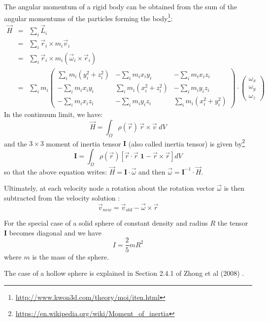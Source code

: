 The angular momentum of a rigid body can be obtained from the sum 
of the angular momentums of the particles forming the 
body\footnote{\url{http://www.kwon3d.com/theory/moi/iten.html}}:
\begin{eqnarray}
\vec H 
&=& \sum_i \vec L_i\\
&=& \sum_i \vec r_i \times m_i \vec v_i\\
&=& \sum_i \vec r_i \times m_i (\vec \omega_i \times \vec r_i)\\
&=& \sum_i m_i 
\left(
\begin{array}{ccc}
\sum_i m_i(y_i^2+z_i^2) & -\sum_i m_i x_iy_i & -\sum_i m_i x_i z_i \\
-\sum_i m_i x_iy_i & \sum_i m_i(x_i^2+z_i^2) & -\sum_i m_i y_i z_i \\
-\sum_i m_i x_i z_i & -\sum_i m_i y_i z_i & \sum_i m_i(x_i^2+y_i^2)
\end{array}
\right)
\cdot
\left(
\begin{array}{c}
\omega_x \\ \omega_y \\ \omega_z
\end{array}
\right)
\end{eqnarray}
In the continuum limit, we have:
\begin{equation}
{\vec H} = \int_\Omega \rho(\vec r) \, {\vec r} \times {\vec v}\; dV
\end{equation}
and the $3\times3$ moment of inertia tensor $\bm I$
(also called inertia tensor) is given by\footnote{\url{https://en.wikipedia.org/wiki/Moment\_of\_inertia}}
\begin{equation}
{\bm I}= 
\int_\Omega \rho(\vec r) [\vec r\cdot\vec r \; \bm 1 - \vec r \times \vec r  ] dV
\end{equation}
so that the above equation writes:
$
{\vec H}={\bm I}\cdot {\vec \omega}
$
and then ${\vec \omega}={\bm I}^{-1} \cdot {\vec H}$.

Ultimately, at each velocity node a rotation about the rotation 
vector ${\vec \omega}$ is then subtracted from the velocity 
solution \cite[eq. 26]{zhmt08}:
\begin{equation}
\vec v_{new} = \vec v_{old} - \vec \omega \times \vec r 
\end{equation}

For the special case of a solid sphere of constant density
and radius $R$ the tensor ${\bm I}$ becomes diagonal
and we have 
\[
I=\frac{2}{5}m R^2
\]
where $m$ is the mass of the sphere. 

The case of a hollow sphere is explained in Section 2.4.1 of Zhong et al (2008) \cite{zhmt08}. 

